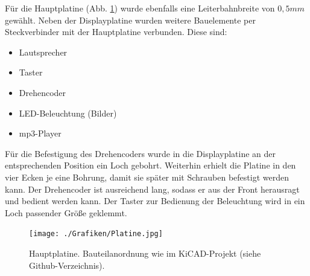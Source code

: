\documentclass[journal, a4paper]{IEEEtran}
\begin{document}
		Für die Hauptplatine (Abb. \ref{fig:Hauptplatine}) wurde ebenfalls eine Leiterbahnbreite von $0,5mm$ gewählt. Neben der Displayplatine wurden weitere Bauelemente per Steckverbinder mit der Hauptplatine verbunden. Diese sind:
		\begin{itemize}
			\item Lautsprecher
			\item Taster
			\item Drehencoder
			\item LED-Beleuchtung (Bilder)
			\item mp3-Player
		\end{itemize}
		Für die Befestigung des Drehencoders wurde in die Displayplatine an der entsprechenden Position ein Loch gebohrt. Weiterhin erhielt die Platine in den vier Ecken je eine Bohrung, damit sie später mit Schrauben befestigt werden kann. Der Drehencoder ist ausreichend lang, sodass er aus der Front herausragt und bedient werden kann. Der Taster zur Bedienung der Beleuchtung wird in ein Loch passender Größe geklemmt.
		
		\begin{figure}
			\begin{center}	
				\texttt{[image: ./Grafiken/Platine.jpg]}
				\caption{Hauptplatine. Bauteilanordnung wie im KiCAD-Projekt (siehe Github-Verzeichnis).}
				\label{fig:Hauptplatine}
			\end{center}
		\end{figure}	
		
\end{document}
